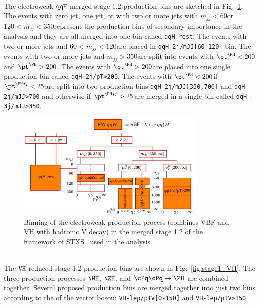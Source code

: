 \\
The electroweak $\tt qqH$ merged stage 1.2 production bins are sketched in Fig.~\ref{fig:stage1_VBF}.
The events with zero jet, one jet, or with two or more jets with $m_{jj}<60$\GeV or $120<m_{jj}<350$\GeV represent the production bins of secondary importance in the analysis and they are all merged into one bin called {\tt qqH-rest}.
The events with two or more jets and $60<m_{jj}<120$\GeV are placed in {\tt qqH-2j/mJJ[60-120]} bin.
The events with two or more jets and $m_{jj}>350$\GeV are split into events with $\pt^{\PH}<200$\GeV and $\pt^{\PH}>200$\GeV.
The events with $\pt^{\PH}>200$\GeV are placed into one single production bin called {\tt qqH-2j/pT>200}.
The events with $\pt^{\PH}<200$\GeV if $\pt^{\PH jj}<25$\GeV are split into two production bins {\tt qqH-2j/mJJ[350,700]} and {\tt qqH-2j/mJJ>700} and otherwise if $\pt^{\PH jj}>25$\GeV are merged in a single bin called {\tt qqH-3j/mJJ>350}.
\begin{figure}[!htb]
	\vspace*{0.3cm}
	\begin{center}
		\includegraphics[width=0.8\textwidth]{Figures/stxs/simplifiedXS_VBF_11.pdf}
		\caption{Binning of the electroweak production process (combines VBF and VH with hadronic V decay) in the merged stage 1.2 of the framework of STXS~\cite{Berger:2019wnu} used in the analysis.
		\label{fig:stage1_VBF}}
	\end{center}
\end{figure}
\\
The $\tt VH$ reduced stage 1.2 production bins are shown in Fig.~\ref{fig:stage1_VH}.
The three production processes $\WH$, $\ZH$, and $\cPq\cPq\to\ZH$ are combined together.
Several proposed production bins are merged together into just two bins according to the \pt of the
vector boson: {\tt VH-lep/pTV[0-150]} and {\tt VH-lep/pTV>150}.
